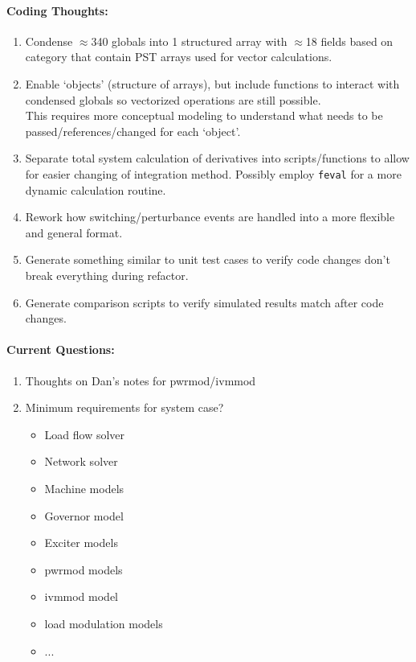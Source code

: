 \documentclass[12pt]{article}
\begin{document}
\begin{multicols}{2}
\vfill\null
\columnbreak

\paragraph{Coding Thoughts:} 
	\begin{enumerate}

		\itemsep 0em 
		\item Condense $\approx$340 globals into 1 structured array with $\approx$18 fields based on category that contain PST arrays used for vector calculations.
		\item Enable `objects' (structure of arrays), but include functions to interact with condensed globals so vectorized operations are still possible.\\
		This requires more conceptual modeling to understand what needs to be passed/references/changed for each `object'.
		\item Separate total system calculation of derivatives into scripts/functions to allow for easier changing of integration method.
		Possibly employ \verb|feval| for a more dynamic calculation routine.
		\item Rework how switching/perturbance events are handled into a more flexible and general format.
		\item Generate something similar to unit test cases to verify code changes don't break everything during refactor.
		\item Generate comparison scripts to verify simulated results match after code changes.
	\end{enumerate}
	


\paragraph{Current Questions:}
	\begin{enumerate}
	\itemsep0em 
\item Thoughts on Dan's notes for pwrmod/ivmmod
		\item Minimum requirements for system case?
\begin{minipage}{\linewidth}
\begin{multicols}{2}
		\begin{itemize}
\itemsep0em 
		\footnotesize
			\item Load flow solver
			\item Network solver
			\item Machine models
			\item Governor model
			\item Exciter models
			\item pwrmod models
			\item ivmmod model
			\item load modulation models
			\item ...
		\end{itemize}
\end{multicols}
\end{minipage}


\end{enumerate}
\end{multicols}
\end{document}
